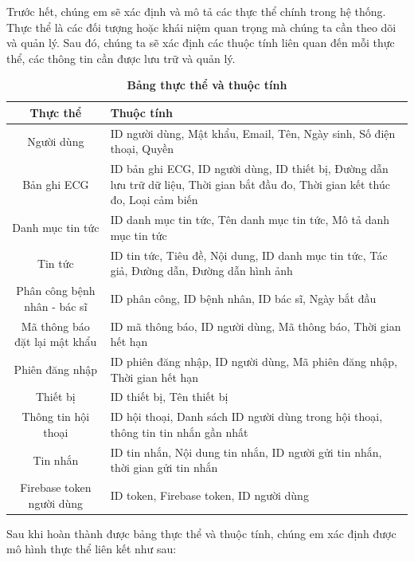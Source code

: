      Trước hết, chúng em sẽ xác định và mô tả các thực thể chính trong hệ
      thống. Thực thể là các đối tượng hoặc khái niệm quan
       trọng mà chúng ta cần theo dõi và quản lý. Sau đó, chúng ta sẽ xác
        định các thuộc tính liên quan đến mỗi thực thể, các thông tin cần
         được lưu trữ và quản lý.

\begin{table}[H]
  \caption{\bfseries \fontsize{12pt}{0pt}\selectfont Bảng thực thể và thuộc tính}
  \centering
  \begin{tabularx}{0.9\textwidth}{|c|X|}
    \hline
    \textbf{Thực thể} & \textbf{Thuộc tính} \\
    \hline
    Người dùng & 
    ID người dùng, Mật khẩu, Email, Tên, Ngày sinh, Số điện thoại, Quyền \\
    \hline
    Bản ghi ECG & 
    ID bản ghi ECG, ID người dùng, ID thiết bị, Đường dẫn lưu trữ dữ liệu, Thời gian bắt đầu đo, Thời gian kết thúc đo, Loại cảm biến \\
    \hline
    Danh mục tin tức & 
    ID danh mục tin tức, Tên danh mục tin tức, Mô tả danh mục tin tức \\
    \hline
    Tin tức & 
    ID tin tức, Tiêu đề, Nội dung, ID danh mục tin tức, Tác giả, Đường dẫn, Đường dẫn hình ảnh \\
    \hline
    Phân công bệnh nhân - bác sĩ & 
    ID phân công, ID bệnh nhân, ID bác sĩ, Ngày bắt đầu \\
    \hline
    Mã thông báo đặt lại mật khẩu & 
    ID mã thông báo, ID người dùng, Mã thông báo, Thời gian hết hạn \\
    \hline
    Phiên đăng nhập & 
    ID phiên đăng nhập, ID người dùng, Mã phiên đăng nhập, Thời gian hết hạn \\
    \hline
    Thiết bị & 
    ID thiết bị, Tên thiết bị \\
    \hline
    Thông tin hội thoại & 
    ID hội thoại, Danh sách ID người dùng trong hội thoại, thông tin tin nhắn gần nhất \\
    \hline
    Tin nhắn & 
    ID tin nhắn, Nội dung tin nhắn, ID người gửi tin nhắn, thời gian gửi tin nhắn \\
    \hline
    Firebase token người dùng & 
    ID token, Firebase token, ID người dùng \\
    \hline
  \end{tabularx}

  
\end{table}
Sau khi hoàn thành được bảng thực thể và thuộc tính, chúng em xác định được mô hình thực thể liên kết như sau:

